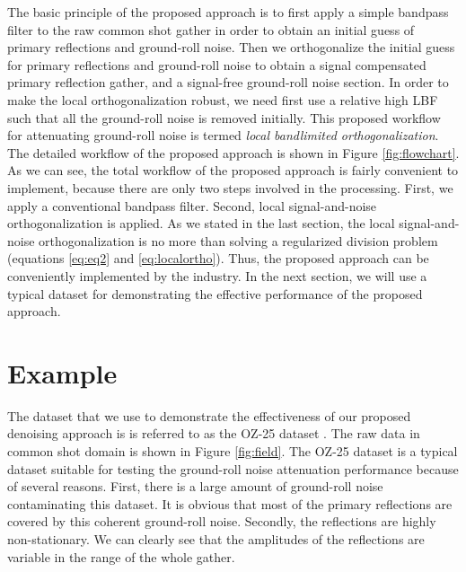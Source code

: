 The basic principle of the proposed approach is to first apply a simple bandpass filter to the raw common shot gather in order to obtain an initial guess of primary reflections and ground-roll noise. Then we orthogonalize the initial guess for primary reflections and ground-roll noise to obtain a signal compensated primary reflection gather, and a signal-free ground-roll noise section. In order to make the local orthogonalization robust, we need first use a relative high LBF such that all the ground-roll noise is removed initially. This proposed workflow for attenuating ground-roll noise is termed \emph{local bandlimited orthogonalization}. The detailed workflow of the proposed approach is shown in Figure \ref{fig:flowchart}. As we can see, the total workflow of the proposed approach is fairly convenient to implement, because there are only two steps involved in the processing. First, we apply a conventional bandpass filter. Second, local signal-and-noise orthogonalization is applied. As we stated in the last section, the local signal-and-noise orthogonalization is no more than solving a regularized division problem (equations \ref{eq:eq2} and \ref{eq:localortho}). Thus, the proposed approach can be conveniently implemented by the industry. In the next section, we will use a typical dataset for demonstrating the effective performance of the proposed approach.


\section{Example}
The dataset that we use to demonstrate the effectiveness of our proposed denoising approach is  is referred to as the OZ-25 dataset \cite{carson2006}.  The raw data in common shot domain is shown in Figure \ref{fig:field}.  The OZ-25 dataset is a typical dataset suitable for testing the ground-roll noise attenuation performance because of several reasons. First,  there is a large amount of ground-roll noise contaminating this dataset. It is obvious that most of the primary reflections are covered by this coherent ground-roll noise. Secondly, the reflections are highly non-stationary. We can clearly see that the amplitudes of the reflections are variable in the range of the whole gather. 

